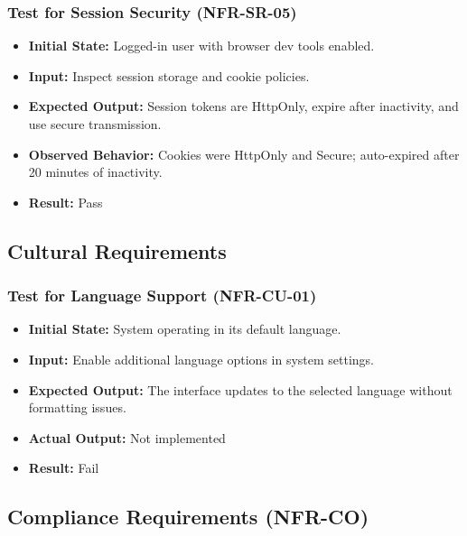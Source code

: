 \documentclass[12pt, titlepage]{article}
\begin{document}
\subsubsection{Test for Session Security (NFR-SR-05)}
\begin{itemize}
    \item \textbf{Initial State:} Logged-in user with browser dev tools enabled.
    \item \textbf{Input:} Inspect session storage and cookie policies.
    \item \textbf{Expected Output:} Session tokens are HttpOnly, expire after inactivity, and use secure transmission.
    \item \textbf{Observed Behavior:} Cookies were HttpOnly and Secure; auto-expired after 20 minutes of inactivity.
    \item \textbf{Result:} Pass
\end{itemize}


\subsection{Cultural Requirements}

\subsubsection{Test for Language Support (NFR-CU-01)}
\begin{itemize}
    \item \textbf{Initial State: }System operating in its default language.
    \item \textbf{Input: }Enable additional language options in system settings.
    \item \textbf{Expected Output: }The interface updates to the selected language without formatting issues.
    \item \textbf{Actual Output: }Not implemented
    \item \textbf{Result: }Fail
\end{itemize}

\subsection{Compliance Requirements (NFR-CO)}
\end{document}
